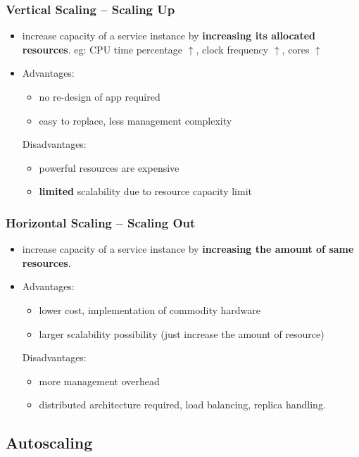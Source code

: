 \subsubsection{Vertical Scaling -- Scaling Up}
\begin{itemize}
	\item increase capacity of a service instance by \textbf{increasing its allocated resources}. eg: CPU time percentage $\uparrow$, clock frequency $\uparrow$, cores $\uparrow$ 
	\item Advantages:
	\begin{itemize}
		\item no re-design of app required
		\item easy to replace, less management complexity
	\end{itemize}
	Disadvantages:
	\begin{itemize}
		\item powerful resources are expensive
		\item \textbf{limited} scalability due to resource capacity limit
	\end{itemize}
\end{itemize}


\subsubsection{Horizontal Scaling -- Scaling Out}
\begin{itemize}
	\item increase capacity of a service instance by \textbf{increasing the amount of same resources}.
	\item Advantages:	
	\begin{itemize}
		\item lower cost, implementation of commodity hardware
		\item larger scalability possibility (just increase the amount of resource)
	\end{itemize}
	Disadvantages:
	\begin{itemize}
		\item more management overhead
		\item distributed architecture required, load balancing, replica handling.
	\end{itemize}
\end{itemize}


\subsection{Autoscaling}


